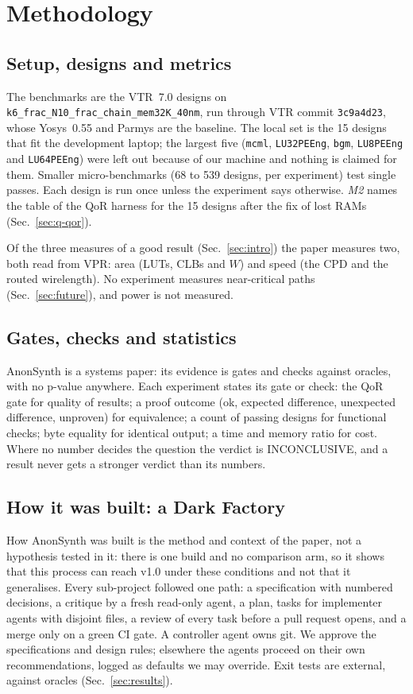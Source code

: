 \documentclass[conference]{IEEEtran}
\newcommand{\code}[1]{\texttt{#1}}
\begin{document}
\section{Methodology}
\label{sec:methodology}

\subsection{Setup, designs and metrics}

The benchmarks are the VTR~7.0 designs on \code{k6\_frac\_N10\_frac\_chain\_mem32K\_40nm}, run through VTR commit \code{3c9a4d23}, whose Yosys~0.55 and Parmys are the baseline. The local set is the 15 designs that fit the development laptop; the largest five (\code{mcml}, \code{LU32PEEng}, \code{bgm}, \code{LU8PEEng} and \code{LU64PEEng}) were left out because of our machine and nothing is claimed for them. Smaller micro-benchmarks (68 to 539 designs, per experiment) test single passes. Each design is run once unless the experiment says otherwise. \emph{M2} names the table of the QoR harness for the 15 designs after the fix of lost RAMs (Sec.~\ref{sec:q-qor}).

Of the three measures of a good result (Sec.~\ref{sec:intro}) the paper measures two, both read from VPR: area (LUTs, CLBs and $W$) and speed (the CPD and the routed wirelength). No experiment measures near-critical paths (Sec.~\ref{sec:future}), and power is not measured.

\subsection{Gates, checks and statistics}

AnonSynth is a systems paper: its evidence is gates and checks against oracles, with no p-value anywhere. Each experiment states its gate or check: the QoR gate for quality of results; a proof outcome (ok, expected difference, unexpected difference, unproven) for equivalence; a count of passing designs for functional checks; byte equality for identical output; a time and memory ratio for cost. Where no number decides the question the verdict is INCONCLUSIVE, and a result never gets a stronger verdict than its numbers.

\subsection{How it was built: a Dark Factory}
\label{sec:method-built}

How AnonSynth was built is the method and context of the paper, not a hypothesis tested in it: there is one build and no comparison arm, so it shows that this process can reach v1.0 under these conditions and not that it generalises. Every sub-project followed one path: a specification with numbered decisions, a critique by a fresh read-only agent, a plan, tasks for implementer agents with disjoint files, a review of every task before a pull request opens, and a merge only on a green CI gate. A controller agent owns git. We approve the specifications and design rules; elsewhere the agents proceed on their own recommendations, logged as defaults we may override. Exit tests are external, against oracles (Sec.~\ref{sec:results}).
\end{document}
